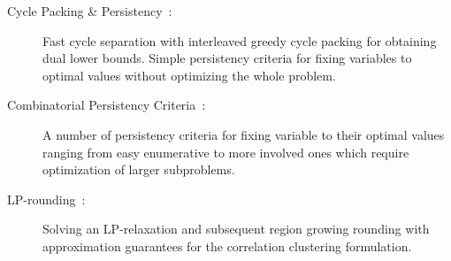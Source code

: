 \begin{description}
\item[Cycle Packing \& Persistency~\cite{lange2018partial}:] Fast cycle separation with interleaved greedy cycle packing for obtaining dual lower bounds. Simple persistency criteria for fixing variables to optimal values without optimizing the whole problem.
\item[Combinatorial Persistency Criteria~\cite{lange2019combinatorial}:] A number of persistency criteria for fixing variable to their optimal values ranging from easy enumerative to more involved ones which require optimization of larger subproblems.
\item[LP-rounding~\cite{demaine2006correlation}:]
    Solving an LP-relaxation and subsequent region growing rounding with approximation guarantees for the correlation clustering formulation.
\end{description}
